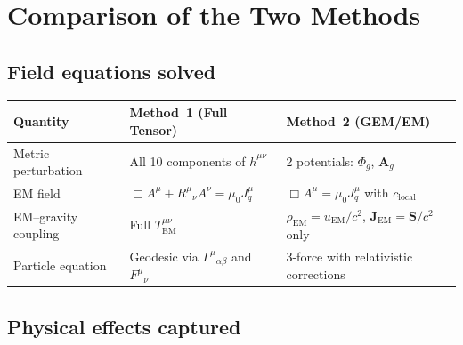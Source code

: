 \documentclass[11pt,a4paper]{article}
\newcommand{\vv}[1]{\mathbf{#1}}
\newcommand{\Phig}{\Phi_g}
\newcommand{\Ag}{\vv{A}_g}
\begin{document}
\section{Comparison of the Two Methods}

\subsection{Field equations solved}

\begin{center}
\begin{tabular}{@{}L{3.2cm}L{5.0cm}L{5.0cm}@{}}
\toprule
\textbf{Quantity} & \textbf{Method~1 (Full Tensor)} & \textbf{Method~2 (GEM/EM)} \\
\midrule
Metric perturbation & All 10 components of $\bar{h}^{\mu\nu}$ & 2 potentials: $\Phig$, $\Ag$ \\[4pt]
EM field & $\Box A^\mu + R^\mu{}_\nu A^\nu = \mu_0 J^\mu_q$ & $\Box A^\mu = \mu_0 J^\mu_q$ with $c_{\mathrm{local}}$ \\[4pt]
EM--gravity coupling & Full $T^{\mu\nu}_{\mathrm{EM}}$ & $\rho_{\mathrm{EM}}=u_{\mathrm{EM}}/c^2$, $\vv{J}_{\mathrm{EM}}=\vv{S}/c^2$ only \\[4pt]
Particle equation & Geodesic via $\Gamma^\mu{}_{\alpha\beta}$ and $F^\mu{}_\nu$ & 3-force with relativistic corrections \\
\bottomrule
\end{tabular}
\end{center}

\subsection{Physical effects captured}
\end{document}
